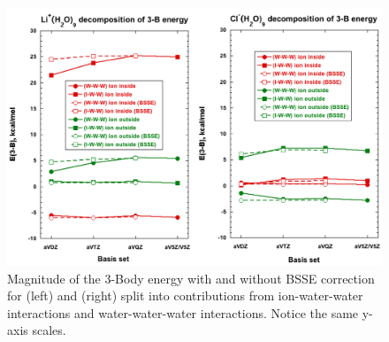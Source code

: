\begin{figure}[t]
\uwsinglespace
\begin{center}
\includegraphics[width=\textwidth]{Figures/Chapter_3/figure_5_combined.png}
\end{center}
\begin{spacing}{1.0}
\caption[Magnitude of the 3-Body energy with and without BSSE correction for  (left) and  (right) split into contributions from ion-water-water interactions and water-water-water interactions. Notice the same y-axis scales.]{Magnitude of the 3-Body energy with and without BSSE correction for  (left) and  (right) split into contributions from ion-water-water interactions and water-water-water interactions. Notice the same y-axis scales.}\label{fig:MBE_II_5}
\end{spacing}
\end{figure}